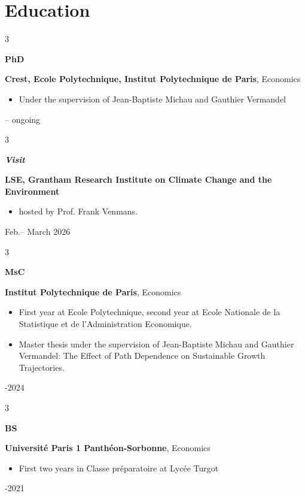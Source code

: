 \documentclass[10pt, letterpaper]{article}
\newenvironment{highlights}{
    \begin{itemize}[
        topsep=0.10 cm,
        parsep=0.10 cm,
        partopsep=0pt,
        itemsep=0pt,
        leftmargin=0.4 cm + 10pt
    ]
}{
    \end{itemize}
} %
\newenvironment{threecolentry}[3][]{
    \onecolentry
    \def\thirdColumn{#3}
    \setcolumnwidth{1 cm, \fill, 4.5 cm}
    \begin{paracol}{3}
    {\raggedright #2} \switchcolumn
}{
    \switchcolumn \raggedleft \thirdColumn
    \end{paracol}
    \endonecolentry
} %
\begin{document}
    \section{Education}

        \begin{threecolentry}
            {\textbf{PhD}}
            {2024 -- ongoing}
            \textbf{Crest, Ecole Polytechnique, Institut Polytechnique de Paris}, Economics
            \begin{highlights}
                \item Under the supervision of Jean-Baptiste Michau and Gauthier Vermandel
            \end{highlights}
        \end{threecolentry}
        
    \vspace{0.2 cm} 
    
        \begin{threecolentry}{\textbf{\textit{Visit}}}
        {Feb.-- March 2026}
        \textbf{LSE, Grantham Research Institute on Climate Change and the Environment}
        \begin{highlights}
            \item hosted by Prof. Frank Venmans.
        \end{highlights}
        
        \end{threecolentry}
        
    \vspace{0.2 cm}    
    
        \begin{threecolentry}{\textbf{MsC}}{
            2022-2024
        }
            \textbf{Institut Polytechnique de Paris}, Economics
            \begin{highlights}
                \item First year at Ecole Polytechnique, second year at Ecole Nationale de la Statistique et de l'Administration Economique.
                \item Master thesis under the supervision of Jean-Baptiste Michau and Gauthier Vermandel: The Effect of Path Dependence on Sustainable Growth Trajectories. 
            \end{highlights}
        \end{threecolentry}

        \vspace{0.2 cm}
        
        \begin{threecolentry}{\textbf{BS}}{
            2018-2021
        }
            \textbf{Université Paris 1 Panthéon-Sorbonne}, Economics
            \begin{highlights}
                \item First two years in Classe préparatoire at Lycée Turgot
            \end{highlights}
        \end{threecolentry}
\end{document}
